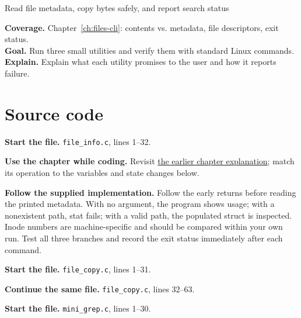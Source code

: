 \begin{labproject}{Read file metadata, copy bytes safely, and report search status}

\textbf{Coverage.} Chapter~\ref{ch:files-cli}: contents vs. metadata, file descriptors, exit status.\\
\textbf{Goal.} Run three small utilities and verify them with standard Linux commands.\\
\textbf{Explain.} Explain what each utility promises to the user and how it reports failure.




\section*{Source code}
\noindent\textbf{Start the file.} \texttt{file\_info.c}, lines 1--32.

\textbf{Use the chapter while coding.} Revisit \hyperref[ch:files-cli]{the earlier chapter explanation}; match its operation to the variables and state changes below.

\textbf{Follow the supplied implementation.} Follow the early returns before reading the printed metadata. With no argument, the program shows usage; with a nonexistent path, stat fails; with a valid path, the populated struct is inspected. Inode numbers are machine-specific and should be compared within your own run. Test all three branches and record the exit status immediately after each command.




\noindent\textbf{Start the file.} \texttt{file\_copy.c}, lines 1--31.


\noindent\textbf{Continue the same file.} \texttt{file\_copy.c}, lines 32--63.


\noindent\textbf{Start the file.} \texttt{mini\_grep.c}, lines 1--30.



\end{labproject}
